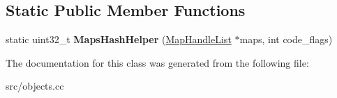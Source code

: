 \subsection*{Static Public Member Functions}
\begin{DoxyCompactItemize}
\item 
\hypertarget{classv8_1_1internal_1_1_polymorphic_code_cache_hash_table_key_adcb2f2a2a4ccda82369568e2bb3984b8}{}static uint32\+\_\+t {\bfseries Maps\+Hash\+Helper} (\hyperlink{classv8_1_1internal_1_1_list}{Map\+Handle\+List} $\ast$maps, int code\+\_\+flags)\label{classv8_1_1internal_1_1_polymorphic_code_cache_hash_table_key_adcb2f2a2a4ccda82369568e2bb3984b8}

\end{DoxyCompactItemize}


The documentation for this class was generated from the following file\+:\begin{DoxyCompactItemize}
\item 
src/objects.\+cc\end{DoxyCompactItemize}
